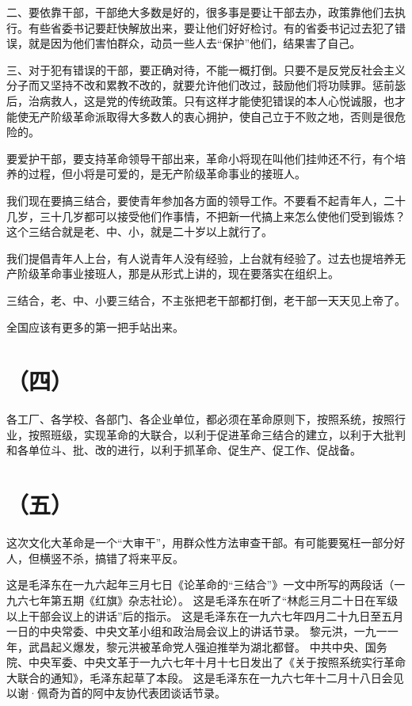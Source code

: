 二、要依靠干部，干部绝大多数是好的，很多事是要让干部去办，政策靠他们去执行。有些省委书记要赶快解放出来，要让他们好好检讨。有的省委书记过去犯了错误，就是因为他们害怕群众，动员一些人去“保护”他们，结果害了自己。

三、对于犯有错误的干部，要正确对待，不能一概打倒。只要不是反党反社会主义分子而又坚持不改和累教不改的，就要允许他们改过，鼓励他们将功赎罪。惩前毖后，治病救人，这是党的传统政策。只有这样才能使犯错误的本人心悦诚服，也才能使无产阶级革命派取得大多数人的衷心拥护，使自己立于不败之地，否则是很危险的。

要爱护干部，要支持革命领导干部出来，革命小将现在叫他们挂帅还不行，有个培养的过程，但小将是可爱的，是无产阶级革命事业的接班人。

我们现在要搞三结合，要使青年参加各方面的领导工作。不要看不起青年人，二十几岁，三十几岁都可以接受他们作事情，不把新一代搞上来怎么使他们受到锻炼？这个三结合就是老、中、小，就是二十岁以上就行了。

我们提倡青年人上台，有人说青年人没有经验，上台就有经验了。过去也提培养无产阶级革命事业接班人，那是从形式上讲的，现在要落实在组织上。

三结合，老、中、小要三结合，不主张把老干部都打倒，老干部一天天见上帝了。

全国应该有更多的第一把手站出来。

\date{一九六七年十月十七日}
\section*{（四）}

各工厂、各学校、各部门、各企业单位，都必须在革命原则下，按照系统，按照行业，按照班级，实现革命的大联合，以利于促进革命三结合的建立，以利于大批判和各单位斗、批、改的进行，以利于抓革命、促生产、促工作、促战备。

\date{一九六七年十二月十八日}
\section*{（五）}

这次文化大革命是一个“大审干”，用群众性方法审查干部。有可能要冤枉一部分好人，但横竖不杀，搞错了将来平反。

\begin{maonote}
这是毛泽东在一九六起年三月七日《论革命的“三结合”》一文中所写的两段话（一九六七年第五期《红旗》杂志社论）。
这是毛泽东在听了“林彪三月二十日在军级以上干部会议上的讲话”后的指示。
这是毛泽东在一九六七年四月二十九日至五月一日的中央常委、中央文革小组和政治局会议上的讲话节录。
黎元洪，一九一一年，武昌起义爆发，黎元洪被革命党人强迫推举为湖北都督。
中共中央、国务院、中央军委、中央文革于一九六七年十月十七日发出了《关于按照系统实行革命大联合的通知》，毛泽东起草了本段。
这是毛泽东在一九六七年十二月十八日会见以谢·佩奇为首的阿中友协代表团谈话节录。
\end{maonote}
